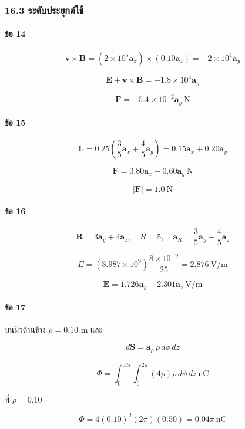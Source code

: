 \subsubsection{16.3 ระดับประยุกต์ใช้}

\paragraph{ข้อ 14}

\[
\mathbf{v}\times\mathbf{B}
=(2\times10^5\mathbf{a}_x)\times(0.10\mathbf{a}_z)
=-2\times10^4\mathbf{a}_y
\]

\[
\mathbf{E}+\mathbf{v}\times\mathbf{B}
=-1.8\times10^4\mathbf{a}_y
\]

\[
\boxed{\mathbf{F}=-5.4\times10^{-2}\mathbf{a}_y\ \text{N}}
\]

\paragraph{ข้อ 15}

\[
\mathbf{L}=0.25\left(\frac{3}{5}\mathbf{a}_x+\frac{4}{5}\mathbf{a}_y\right)
=0.15\mathbf{a}_x+0.20\mathbf{a}_y
\]

\[
\boxed{\mathbf{F}=0.80\mathbf{a}_x-0.60\mathbf{a}_y\ \text{N}}
\]

\[
|\mathbf{F}|=1.0\ \text{N}
\]

\paragraph{ข้อ 16}

\[
\mathbf{R}=3\mathbf{a}_y+4\mathbf{a}_z,\quad
R=5,\quad
\mathbf{a}_R=\frac{3}{5}\mathbf{a}_y+\frac{4}{5}\mathbf{a}_z
\]

\[
E=(8.987\times10^9)\frac{8\times10^{-9}}{25}
=2.876\ \text{V/m}
\]

\[
\boxed{\mathbf{E}=1.726\mathbf{a}_y+2.301\mathbf{a}_z\ \text{V/m}}
\]

\paragraph{ข้อ 17}

บนผิวด้านข้าง \(\rho=0.10\) m และ

\[
d\mathbf{S}=\mathbf{a}_\rho\,\rho\,d\phi\,dz
\]

\[
\Phi=\int_0^{0.5}\int_0^{2\pi}
(4\rho)\rho\,d\phi\,dz\ \text{nC}
\]

ที่ \(\rho=0.10\)

\[
\Phi=4(0.10)^2(2\pi)(0.50)=0.04\pi\ \text{nC}
\]

